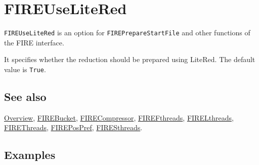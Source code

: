 \documentclass[../FeynHelpersManual.tex]{subfiles}
\begin{document}
\begin{Shaded}
\begin{Highlighting}[]
 
\end{Highlighting}
\end{Shaded}

\hypertarget{fireuselitered}{
\section{FIREUseLiteRed}\label{fireuselitered}}

\texttt{FIREUseLiteRed} is an option for \texttt{FIREPrepareStartFile}
and other functions of the FIRE interface.

It specifies whether the reduction should be prepared using LiteRed. The
default value is \texttt{True}.

\subsection{See also}

\hyperlink{toc}{Overview}, \hyperlink{firebucket}{FIREBucket},
\hyperlink{firecompressor}{FIRECompressor},
\hyperlink{firefthreads}{FIREFthreads},
\hyperlink{firelthreads}{FIRELthreads},
\hyperlink{firethreads}{FIREThreads},
\hyperlink{firepospref}{FIREPosPref},
\hyperlink{firesthreads}{FIRESthreads}.

\subsection{Examples}
\end{document}
